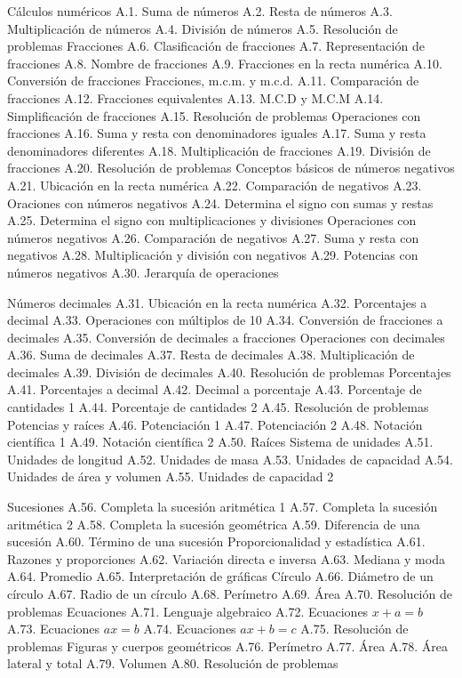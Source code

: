 Cálculos numéricos
 A.1.  Suma de números
 A.2.  Resta de números
 A.3.  Multiplicación de números
 A.4.  División de números
 A.5.  Resolución de problemas
Fracciones
 A.6.  Clasificación de fracciones
 A.7.  Representación de fracciones
 A.8.  Nombre de fracciones
 A.9.  Fracciones en la recta numérica
 A.10. Conversión de fracciones
Fracciones, m.c.m. y m.c.d.
 A.11. Comparación de fracciones
 A.12. Fracciones equivalentes
 A.13. M.C.D y M.C.M
 A.14. Simplificación de fracciones
 A.15. Resolución de problemas
Operaciones con fracciones
 A.16. Suma y resta con denominadores iguales
 A.17. Suma y resta denominadores diferentes
 A.18. Multiplicación de fracciones
 A.19. División de fracciones
 A.20. Resolución de problemas
Conceptos básicos de números negativos
 A.21. Ubicación en la recta numérica
 A.22. Comparación de negativos
 A.23. Oraciones con números negativos
 A.24. Determina el signo con sumas y restas
 A.25. Determina el signo con multiplicaciones y divisiones
Operaciones con números negativos
 A.26. Comparación de negativos
 A.27. Suma y resta con negativos
 A.28. Multiplicación y división con negativos
 A.29. Potencias con números negativos
 A.30. Jerarquía de operaciones

Números decimales
A.31. Ubicación en la recta numérica
A.32. Porcentajes a decimal
A.33. Operaciones con múltiplos de 10
A.34. Conversión de fracciones a decimales
A.35. Conversión de decimales a fracciones
Operaciones con decimales
A.36. Suma de decimales
A.37. Resta de decimales
A.38. Multiplicación de decimales
A.39. División de decimales
A.40. Resolución de problemas
Porcentajes
A.41. Porcentajes a decimal
A.42. Decimal a porcentaje
A.43. Porcentaje de cantidades 1
A.44. Porcentaje de cantidades 2
A.45. Resolución de problemas
Potencias y raíces
A.46. Potenciación 1
A.47. Potenciación 2
A.48. Notación científica 1
A.49. Notación científica 2
A.50. Raíces
Sistema de unidades
A.51. Unidades de longitud
A.52. Unidades de masa
A.53. Unidades de capacidad
A.54. Unidades de área y volumen
A.55. Unidades de capacidad 2

Sucesiones
A.56. Completa la sucesión aritmética 1
A.57. Completa la sucesión aritmética 2
A.58. Completa la sucesión geométrica
A.59. Diferencia de una sucesión
A.60. Término de una sucesión
Proporcionalidad y estadística
A.61. Razones y proporciones
A.62. Variación directa e inversa
A.63. Mediana y moda
A.64. Promedio
A.65. Interpretación de gráficas
Círculo
A.66. Diámetro de un círculo
A.67. Radio de un círculo
A.68. Perímetro
A.69. Área
A.70. Resolución de problemas
Ecuaciones
A.71. Lenguaje algebraico
A.72. Ecuaciones $x+a=b$
A.73. Ecuaciones $ax=b$
A.74. Ecuaciones $ax+b=c$
A.75. Resolución de problemas
Figuras y cuerpos geométricos
A.76. Perímetro
A.77. Área
A.78. Área lateral y total
A.79. Volumen
A.80. Resolución de problemas